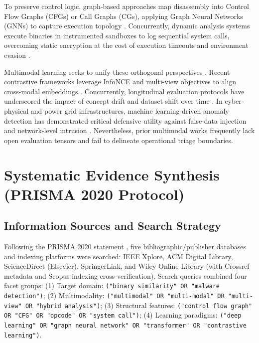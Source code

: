 \documentclass[pdflatex,sn-mathphys-num]{sn-jnl}
\begin{document}
To preserve control logic, graph-based approaches map disassembly into Control Flow Graphs (CFGs) or Call Graphs (CGs), applying Graph Neural Networks (GNNs) to capture execution topology \cite{Wu2021GNN,Qiang2022,SHIELD2026,Codeformer2023}. Concurrently, dynamic analysis systems execute binaries in instrumented sandboxes to log sequential system calls, overcoming static encryption at the cost of execution timeouts and environment evasion \cite{Landman2021DeepHook,MalInsight2019,Alzaylaee2020,SuarezTangil2018}.

Multimodal learning seeks to unify these orthogonal perspectives \cite{Baltrusaitis2019}. Recent contrastive frameworks leverage InfoNCE and multi-view objectives to align cross-modal embeddings \cite{LeKhac2020,FewMHGCL2023,BinCola2024}. Concurrently, longitudinal evaluation protocols have underscored the impact of concept drift and dataset shift over time \cite{Joyce2023MOTIF,Jiang2024BenchMFC,Guerra2022}. In cyber-physical and power grid infrastructures, machine learning-driven anomaly detection has demonstrated critical defensive utility against false-data injection and network-level intrusion \cite{Almalaq2023Power,Almalaq2022Deep,Alnowibet2021Energy}. Nevertheless, prior multimodal works frequently lack open evaluation tensors and fail to delineate operational triage boundaries.

\section{Systematic Evidence Synthesis (PRISMA 2020 Protocol)}\label{sec:prisma}

\subsection{Information Sources and Search Strategy}\label{sec:prisma_sources}
Following the PRISMA 2020 statement \cite{Page2021PRISMA}, five bibliographic/publisher databases and indexing platforms were searched: IEEE Xplore, ACM Digital Library, ScienceDirect (Elsevier), SpringerLink, and Wiley Online Library (with Crossref metadata and Scopus indexing cross-verification). Search queries combined four facet groups: (1) Target domain: \texttt{("binary similarity" OR "malware detection")}; (2) Multimodality: \texttt{("multimodal" OR "multi-modal" OR "multi-view" OR "hybrid analysis")}; (3) Structural features: \texttt{("control flow graph" OR "CFG" OR "opcode" OR "system call")}; (4) Learning paradigms: \texttt{("deep learning" OR "graph neural network" OR "transformer" OR "contrastive learning")}.
\end{document}
